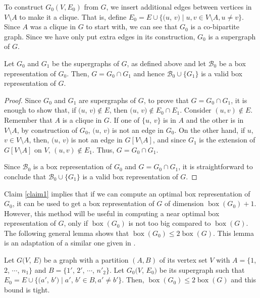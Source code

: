 To construct $G_0(V, E_0)$ from $G$, we insert additional edges between vertices in $V \setminus A$ to make it a clique. That is, define $E_0 = E \cup \{(u$, $v) \mid u, v \in V \setminus A, u \ne v \}$. Since $A$ was a clique in $G$ to start with, we can see that $G_0$ is a co-bipartite graph. Since we have only put extra edges in its construction, $G_0$ is a supergraph of $G$. 
\begin{claim}\label{claim1}
 Let $G_0$ and $G_1$ be the supergraphs of $G$, as defined above and let $\mathcal{B}_0$ be a box representation of $G_0$. Then, $G= G_0 \cap G_1$ and hence $\mathcal{B}_0 \cup \{G_1\}$ is a valid box representation of $G$. 
\end{claim}
\begin{proof}
Since $G_0$ and $G_1$ are supergraphs of $G$, to prove that $G= G_0 \cap G_1$, it is enough to show that, if $(u$, $v)\notin E$, then $(u$, $v) \notin E_0 \cap E_1$. Consider $(u, v)\notin E$. Remember that $A$ is a clique in $G$. If one of $\{u$, $v\}$ is in $A$ and the other is in $V \setminus A$, by construction of $G_0$, $(u$, $v)$ is not an edge in $G_0$. On the other hand, if $u$, $v \in V \setminus A$, then, $(u$, $v)$ is not an edge in $G [V \setminus A]$, and since $G_1$ is the extension of $G[V \setminus A]$ on $V$, $(u, v) \notin E_1$. Thus, $G= G_0 \cap G_1$.

Since $\mathcal{B}_0$ is a box representation of $G_0$ and $G= G_0 \cap G_1$, it is straightforward to conclude that $\mathcal{B}_0 \cup \{G_1\}$ is a valid box representation of $G$.
\end{proof}
Claim \ref{claim1} implies that if we can compute an optimal box representation of $G_0$, it can be used to get a box representation of $G$ of dimension $\operatorname{box}(G_0)+1$. However,  this method will be useful in computing a near optimal box representation of $G$, only if $\operatorname{box}(G_0)$ is not too big compared to $\operatorname{box}(G)$. The following general lemma shows that $\operatorname{box}(G_0) \le 2 \operatorname{box}(G)$. This lemma is an adaptation of a similar one given in \cite{Abh1}.
 \begin{lemma} \label{lem4version1}
  Let $G(V$, $E)$ be a graph with a partition $(A, B)$ of its vertex set $V$ with $A = \{1$, $2$, $\cdots$, $n_1\}$ and $B = \{1'$, $2'$, $\cdots$, $n'_2\}$. Let $G_0(V$, $E_0)$ be its supergraph such that $E_0 = E \cup \{(a'$, $b') \mid a'$, $b' \in B, a' \ne b' \}$. Then, $\operatorname{box}(G_0) \le 2 \operatorname{box}(G)$ and this bound is tight.
 \end{lemma}
